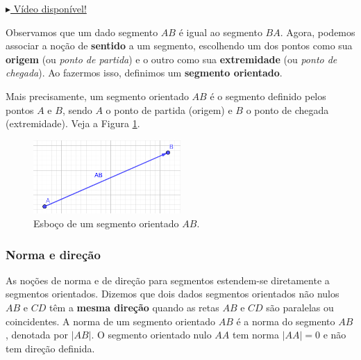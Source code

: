 \begin{flushright}
  \href{https://archive.org/details/definicao-segmento-orientado}{$\blacktriangleright$ Vídeo disponível!}
\end{flushright}

Observamos que um dado segmento $AB$ é igual ao segmento $BA$. Agora, podemos associar a noção de {\bf sentido} a um segmento, escolhendo um dos pontos como sua {\bf origem} (ou \emph{ponto de partida}) e o outro como sua {\bf extremidade} (ou \emph{ponto de chegada}). Ao fazermos isso, definimos um {\bf segmento orientado}.

Mais precisamente, um segmento orientado $AB$ é o segmento definido pelos pontos $A$ e $B$, sendo $A$ o ponto de partida (origem) e $B$ o ponto de chegada (extremidade). Veja a Figura \ref{fig:seg_orientado}.

\begin{figure}[H]
  \centering
  \includegraphics[width=0.5\textwidth]{./cap_vetor/dados/fig_seg_orientado/fig_seg_orientado}
  \caption{Esboço de um segmento orientado $AB$.}
  \label{fig:seg_orientado}
\end{figure}

\subsubsection{Norma e direção}

As noções de norma e de direção para segmentos estendem-se diretamente a segmentos orientados. Dizemos que dois dados segmentos orientados não nulos $AB$ e $CD$ têm a {\bf mesma direção} quando as retas $AB$ e $CD$ são paralelas ou coincidentes. A norma de um segmento orientado $AB$ é a norma do segmento $AB$, denotada por $|AB|$. O segmento orientado nulo $AA$ tem norma $|AA|=0$ e não tem direção definida.

